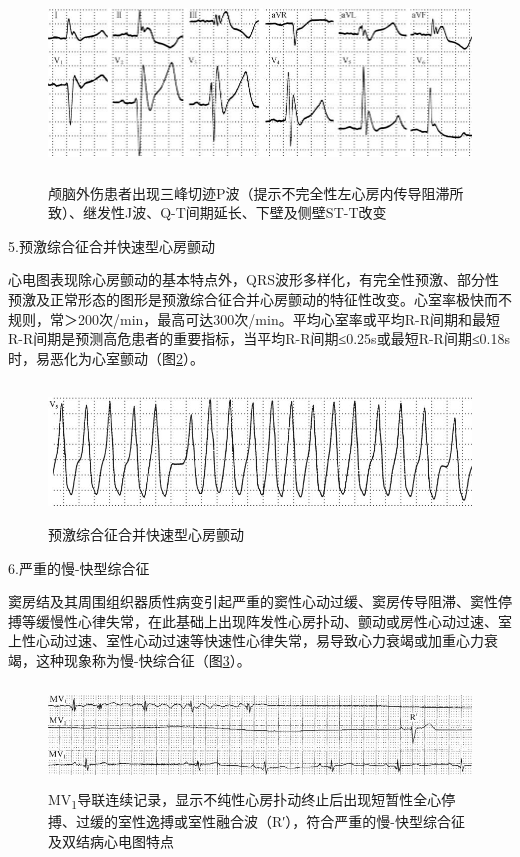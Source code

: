 \begin{figure}[!htbp]
 \centering
 \includegraphics[width=5.75in,height=2.01042in]{./images/Image00551.jpg}
 \captionsetup{justification=centering}
 \caption{颅脑外伤患者出现三峰切迹P波（提示不完全性左心房内传导阻滞所致）、继发性J波、Q-T间期延长、下壁及侧壁ST-T改变}
 \label{fig34-11}
  \end{figure} 

5.预激综合征合并快速型心房颤动

心电图表现除心房颤动的基本特点外，QRS波形多样化，有完全性预激、部分性预激及正常形态的图形是预激综合征合并心房颤动的特征性改变。心室率极快而不规则，常＞200次/min，最高可达300次/min。平均心室率或平均R-R间期和最短R-R间期是预测高危患者的重要指标，当平均R-R间期≤0.25s或最短R-R间期≤0.18s时，易恶化为心室颤动（图\ref{fig34-12}）。

\begin{figure}[!htbp]
 \centering
 \includegraphics[width=5.625in,height=1.4375in]{./images/Image00552.jpg}
 \captionsetup{justification=centering}
 \caption{预激综合征合并快速型心房颤动}
 \label{fig34-12}
  \end{figure} 

6.严重的慢-快型综合征

窦房结及其周围组织器质性病变引起严重的窦性心动过缓、窦房传导阻滞、窦性停搏等缓慢性心律失常，在此基础上出现阵发性心房扑动、颤动或房性心动过速、室上性心动过速、室性心动过速等快速性心律失常，易导致心力衰竭或加重心力衰竭，这种现象称为慢-快综合征（图\ref{fig34-13}）。

\begin{figure}[!htbp]
 \centering
 \includegraphics[width=5.58333in,height=1.05208in]{./images/Image00553.jpg}
 \captionsetup{justification=centering}
 \caption{MV\textsubscript{1}导联连续记录，显示不纯性心房扑动终止后出现短暂性全心停搏、过缓的室性逸搏或室性融合波（R′），符合严重的慢-快型综合征及双结病心电图特点}
 \label{fig34-13}
  \end{figure} 


